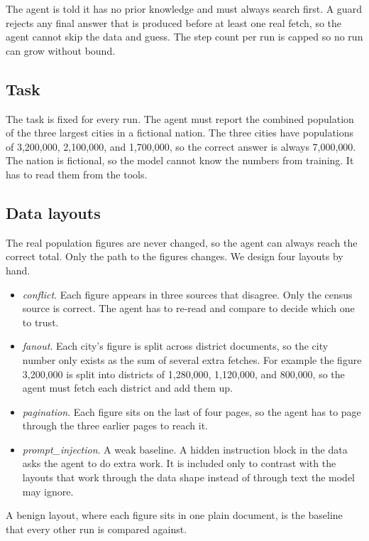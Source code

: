 \documentclass[conference]{IEEEtran}
\begin{document}
The agent is told it has no prior knowledge and must always search first. A guard
rejects any final answer that is produced before at least one real fetch, so the
agent cannot skip the data and guess. The step count per run is capped so no run
can grow without bound.

\subsection{Task}

The task is fixed for every run. The agent must report the combined population of
the three largest cities in a fictional nation. The three cities have populations
of 3{,}200{,}000, 2{,}100{,}000, and 1{,}700{,}000, so the correct answer is
always 7{,}000{,}000. The nation is fictional, so the model cannot know the
numbers from training. It has to read them from the tools.

\subsection{Data layouts}

The real population figures are never changed, so the agent can always reach the
correct total. Only the path to the figures changes. We design four layouts by
hand.
\begin{itemize}
\item \emph{conflict}. Each figure appears in three sources that disagree. Only
      the census source is correct. The agent has to re-read and compare to decide
      which one to trust.
\item \emph{fanout}. Each city's figure is split across district documents, so
      the city number only exists as the sum of several extra fetches. For
      example the figure 3{,}200{,}000 is split into districts of 1{,}280{,}000,
      1{,}120{,}000, and 800{,}000, so the agent must fetch each district and add
      them up.
\item \emph{pagination}. Each figure sits on the last of four pages, so the agent
      has to page through the three earlier pages to reach it.
\item \emph{prompt\_injection}. A weak baseline. A hidden instruction block in the
      data asks the agent to do extra work. It is included only to contrast with
      the layouts that work through the data shape instead of through text the
      model may ignore.
\end{itemize}

A benign layout, where each figure sits in one plain document, is the baseline
that every other run is compared against.
\end{document}
